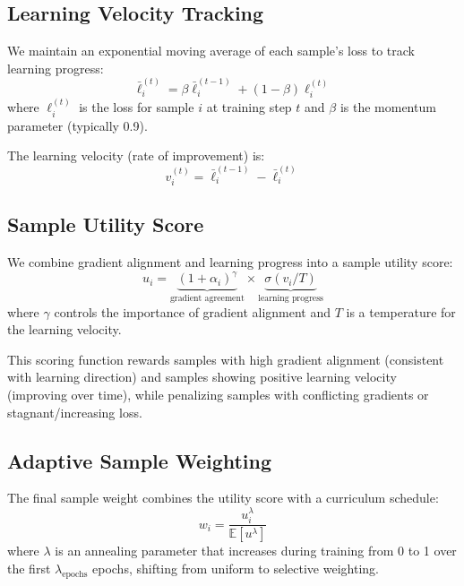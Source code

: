 \documentclass{article}
\begin{document}
\subsection{Learning Velocity Tracking}

We maintain an exponential moving average of each sample's loss to track learning progress:
\begin{equation}
\bar{\ell}_i^{(t)} = \beta \bar{\ell}_i^{(t-1)} + (1-\beta) \ell_i^{(t)}
\end{equation}
where $\ell_i^{(t)}$ is the loss for sample $i$ at training step $t$ and $\beta$ is the momentum parameter (typically 0.9).

The learning velocity (rate of improvement) is:
\begin{equation}
v_i^{(t)} = \bar{\ell}_i^{(t-1)} - \bar{\ell}_i^{(t)}
\end{equation}

\subsection{Sample Utility Score}

We combine gradient alignment and learning progress into a sample utility score:
\begin{equation}
u_i = \underbrace{(1 + \alpha_i)^\gamma}_{\text{gradient agreement}} \times \underbrace{\sigma(v_i / T)}_{\text{learning progress}}
\end{equation}
where $\gamma$ controls the importance of gradient alignment and $T$ is a temperature for the learning velocity.

This scoring function rewards samples with high gradient alignment (consistent with learning direction) and samples showing positive learning velocity (improving over time), while penalizing samples with conflicting gradients or stagnant/increasing loss.

\subsection{Adaptive Sample Weighting}

The final sample weight combines the utility score with a curriculum schedule:
\begin{equation}
w_i = \frac{u_i^\lambda}{\mathbb{E}[u^\lambda]}
\end{equation}
where $\lambda$ is an annealing parameter that increases during training from 0 to 1 over the first $\lambda_{\text{epochs}}$ epochs, shifting from uniform to selective weighting.
\end{document}
